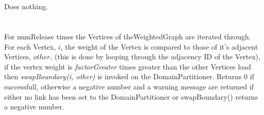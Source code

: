  \\
  \\ 
Does nothing. \\

 \\
 \\ 
For \p numRelease times the Vertices of \p theWeightedGraph are
iterated through. For each Vertex, $i$, the weight of the Vertex is compared
to those of it's adjacent Vertices, $other$, (this is done by looping through
the adjacency ID of the Vertex), if the vertex weight is {\em
factorGreater} times greater than the other Vertices load then {\em
swapBoundary(i, other)} is invoked on the DomainPartitioner. Returns
$0$ if successfull, otherwise a negative number and a warning message
are returned if either no link has been set to the DomainPartitioner
or swapBoundary() returns a negative number. \\



